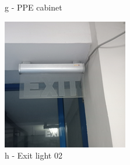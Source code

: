 \begin{figure}[!htb]
\begin{minipage}[b]{0.22\linewidth}
		\caption*{g - PPE cabinet}
	\end{minipage}
	\hspace{0.03cm}
\begin{minipage}[b]{0.22\linewidth}
	\centering
	\includegraphics[width=\textwidth]{figures/ch05_fdas_sd14}
	\caption*{h - Exit light 02}
\end{minipage}
	\hspace{0.03cm}
\begin{minipage}[b]{0.22\linewidth}
	\centering

\end{minipage}
\end{figure}
